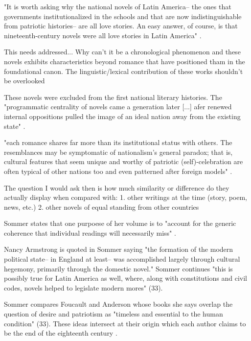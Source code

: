 
	
"It is worth asking why the national novels of Latin America-- the ones that governments institutionalized in the schools and that are now indistinguishable from patriotic histories-- are all love stories. An easy answer, of course, is that nineteenth-century novels were all love stories in Latin America" \cite[30]{Sommer1991}.

	This needs addressed... Why can't it be a chronological phenomenon and these novels exhibits characteristics beyond romance that have positioned tham in the 		foundational canon.
	The linguistic/lexical contribution of these works shouldn't be overlooked

These novels were excluded from the first national literary histories. The "programmatic centrality of novels came a generation later [...] afer renewed internal oppositions pulled the image of an ideal nation away from the existing state" \cite[30]{Sommer1991}.

"each romance shares far more than its institutional status with others. The resemblances may be symptomatic of nationalism's general paradox; that is, cultural features that seem unique and worthy of patriotic (self)-celebration are often typical of other nations too and even patterned after foreign models" \cite[31]{Sommer1991}.

	The question I would ask then is how much similarity or difference do they actually display when compared with:
		1. other writings at the time (story, poem, news, etc.)
		2. other novels of equal standing from other countries

Sommer states that one purpoese of her volume is to "account for the generic coherence that individual readings will necessarily miss" \cite[31]{Sommer1991}.

Nancy Armstrong is quoted in Sommer saying "the formation of the modern political state-- in England at least-- was accomplished largely through cultural hegemony, primarily through the domestic novel." Sommer continues "this is possibly true for Latin America as well, where, along with constitutions and civil codes, novels helped to legislate modern mores" (33).

Sommer compares Foucault and Anderson whose books she says overlap the question of desire and patriotism as "timeless and essential to the human condition" (33).
These ideas intersect at their origin which each author claims to be the end of the eighteenth century \cite[33]{Sommer1991}.


